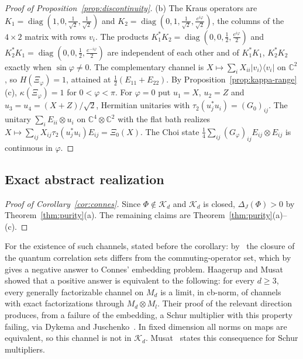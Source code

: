 \documentclass[11pt,a4paper]{article}
\theoremstyle{plain}
\theoremstyle{definition}
\theoremstyle{remark}
\DeclareMathOperator{\diag}{diag}
\begin{document}
\begin{proof}[Proof of Proposition~\ref{prop:discontinuity}]
(b) The Kraus operators are $K_1=\diag(1,0,\frac1{\sqrt2},\frac1{\sqrt2})$ and $K_2=\diag(0,1,\frac1{\sqrt2},\frac{e^{i\varphi}}{\sqrt2})$, the columns of the $4\times2$
matrix with rows $v_i$. The products $K_1^*K_2=\diag(0,0,\frac12,\frac{e^{i\varphi}}2)$ and $K_2^*K_1=\diag(0,0,\frac12,\frac{e^{-i\varphi}}2)$ are independent of each
other and of $K_1^*K_1$, $K_2^*K_2$ exactly when $\sin\varphi\ne0$. The complementary channel is $X\mapsto\sum_iX_{ii}|v_i\rangle\langle v_i|$ on
$\mathbb C^2$, so $H(\Xi_\varphi)=1$, attained at $\frac12(E_{11}+E_{22})$. By Proposition~\ref{prop:kappa-range}(c), $\kappa(\Xi_\varphi)=1$ for $0<\varphi<\pi$. For
$\varphi=0$ put $u_1=X$, $u_2=Z$ and $u_3=u_4=(X+Z)/\sqrt2$, Hermitian unitaries with $\tau_2(u_j^*u_i)=(G_0)_{ij}$. The unitary
$\sum_iE_{ii}\otimes u_i$ on $\mathbb C^4\otimes\mathbb C^2$ with the flat bath realizes $X\mapsto\sum_{ij}X_{ij}\tau_2(u_j^*u_i)E_{ij}=\Xi_0(X)$. The Choi state
$\frac14\sum_{ij}(G_\varphi)_{ij}E_{ij}\otimes E_{ij}$ is continuous in $\varphi$.
\end{proof}

\subsection{Exact abstract realization}

\begin{proof}[Proof of Corollary~\ref{cor:connes}]
Since $\Phi\notin\mathcal K_d$ and $\mathcal K_d$ is closed, $\Delta_J(\Phi)>0$ by Theorem~\ref{thm:purity}(a). The remaining claims are
Theorem~\ref{thm:purity}(a)--(c).
\end{proof}

For the existence of such channels, stated before the corollary: by~\cite[Theorem~12.10]{JNVWY2020} the closure of the quantum correlation sets differs from the commuting-operator set, which by~\cite{Fritz2012,JNPPSW2011,Ozawa2013}
gives a negative answer to Connes' embedding problem. Haagerup and Musat~\cite[Theorem~3.7]{HaagerupMusat2015} showed that a positive answer is
equivalent to the following: for every $d\ge3$, every generally factorizable channel on $M_d$ is a limit, in cb-norm, of channels with exact
factorizations through $M_d\otimes M_l$. Their proof of the relevant direction produces, from a failure of the embedding, a Schur multiplier with
this property failing, via Dykema and Juschenko~\cite{DykemaJuschenko2011}. In fixed dimension all norms on maps are equivalent, so this channel
is not in $\mathcal K_d$. Musat~\cite[Corollary~3.11]{Musat2025} states this consequence for Schur multipliers.
\end{document}
